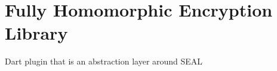 \section{Fully Homomorphic Encryption Library}

Dart plugin that is an abstraction layer around SEAL
